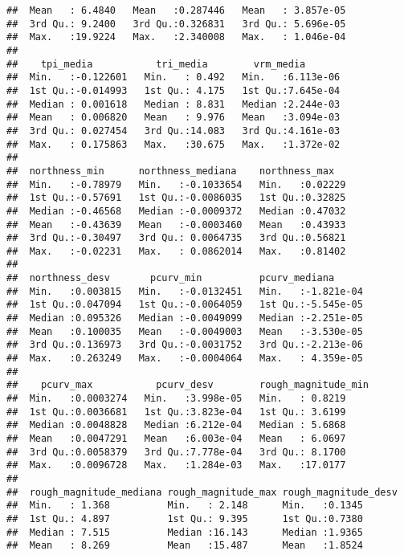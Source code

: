 \documentclass[11pt,]{article}
\begin{document}
\begin{verbatim}
##  Mean   : 6.4840   Mean   :0.287446   Mean   : 3.857e-05  
##  3rd Qu.: 9.2400   3rd Qu.:0.326831   3rd Qu.: 5.696e-05  
##  Max.   :19.9224   Max.   :2.340008   Max.   : 1.046e-04  
##                                                           
##    tpi_media           tri_media        vrm_media        
##  Min.   :-0.122601   Min.   : 0.492   Min.   :6.113e-06  
##  1st Qu.:-0.014993   1st Qu.: 4.175   1st Qu.:7.645e-04  
##  Median : 0.001618   Median : 8.831   Median :2.244e-03  
##  Mean   : 0.006820   Mean   : 9.976   Mean   :3.094e-03  
##  3rd Qu.: 0.027454   3rd Qu.:14.083   3rd Qu.:4.161e-03  
##  Max.   : 0.175863   Max.   :30.675   Max.   :1.372e-02  
##                                                          
##  northness_min      northness_mediana    northness_max    
##  Min.   :-0.78979   Min.   :-0.1033654   Min.   :0.02229  
##  1st Qu.:-0.57691   1st Qu.:-0.0086035   1st Qu.:0.32825  
##  Median :-0.46568   Median :-0.0009372   Median :0.47032  
##  Mean   :-0.43639   Mean   :-0.0003460   Mean   :0.43933  
##  3rd Qu.:-0.30497   3rd Qu.: 0.0064735   3rd Qu.:0.56821  
##  Max.   :-0.02231   Max.   : 0.0862014   Max.   :0.81402  
##                                                           
##  northness_desv       pcurv_min          pcurv_mediana       
##  Min.   :0.003815   Min.   :-0.0132451   Min.   :-1.821e-04  
##  1st Qu.:0.047094   1st Qu.:-0.0064059   1st Qu.:-5.545e-05  
##  Median :0.095326   Median :-0.0049099   Median :-2.251e-05  
##  Mean   :0.100035   Mean   :-0.0049003   Mean   :-3.530e-05  
##  3rd Qu.:0.136973   3rd Qu.:-0.0031752   3rd Qu.:-2.213e-06  
##  Max.   :0.263249   Max.   :-0.0004064   Max.   : 4.359e-05  
##                                                              
##    pcurv_max           pcurv_desv        rough_magnitude_min
##  Min.   :0.0003274   Min.   :3.998e-05   Min.   : 0.8219    
##  1st Qu.:0.0036681   1st Qu.:3.823e-04   1st Qu.: 3.6199    
##  Median :0.0048828   Median :6.212e-04   Median : 5.6868    
##  Mean   :0.0047291   Mean   :6.003e-04   Mean   : 6.0697    
##  3rd Qu.:0.0058379   3rd Qu.:7.778e-04   3rd Qu.: 8.1700    
##  Max.   :0.0096728   Max.   :1.284e-03   Max.   :17.0177    
##                                                             
##  rough_magnitude_mediana rough_magnitude_max rough_magnitude_desv
##  Min.   : 1.368          Min.   : 2.148      Min.   :0.1345      
##  1st Qu.: 4.897          1st Qu.: 9.395      1st Qu.:0.7380      
##  Median : 7.515          Median :16.143      Median :1.9365      
##  Mean   : 8.269          Mean   :15.487      Mean   :1.8524      

\end{verbatim}
\end{document}
